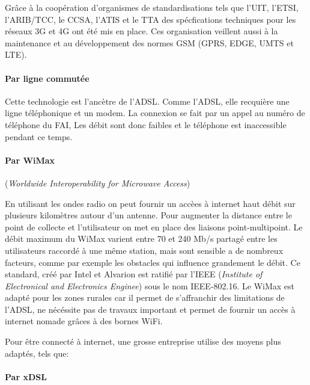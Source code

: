  \smallskip

 Grâce à la coopération d'organismes de standardisations tels que l'UIT, l'ETSI, l'ARIB/TCC, le CCSA, l'ATIS et le TTA des spécfications techniques pour les réseaux 3G et 4G ont été mis en place. Ces organisation veillent aussi à la maintenance et au développement des normes GSM (GPRS, EDGE, UMTS et LTE).

 \paragraph{Par ligne commutée}\leavevmode

 \smallskip

 Cette technologie est l'ancètre de l'ADSL\@. Comme l'ADSL, elle recquière une ligne téléphonique et un modem. La connexion se fait par un appel au numéro de téléphone du FAI, Les débit sont donc faibles et le téléphone est inaccessible pendant ce temps.


 \paragraph{Par WiMax} (\textit{Worldwide Interoperability for Microwave Access})\leavevmode

 \smallskip

 En utilisant les ondes radio on peut fournir un accèes à internet haut débit sur plusieurs kilomètres autour d'un antenne. Pour augmenter la distance entre le point de collecte et l'utilisateur on met en place des liaisons point-multipoint. Le débit maximum du WiMax varient entre 70 et 240 Mb/s partagé entre les utilisateurs raccordé à une même station, mais sont sensible a de nombreux facteurs, comme par exemple les obstacles qui influence grandement le débit.
 Ce standard, créé par Intel et Alvarion est ratifié par l'IEEE (\textit{Institute of Electronical and Electronics Enginee}) sous le nom IEEE-802.16. Le WiMax est adapté pour les zones rurales car il permet de s'affranchir des limitations de l'ADSL, ne nécéssite pas de travaux important et permet de fournir un accès à internet nomade grâces à des bornes WiFi.\\
 \smallskip

 Pour être connecté à internet, une grosse entreprise utilise des moyens plus adaptés, tels que:


 \paragraph{Par xDSL}\leavevmode

